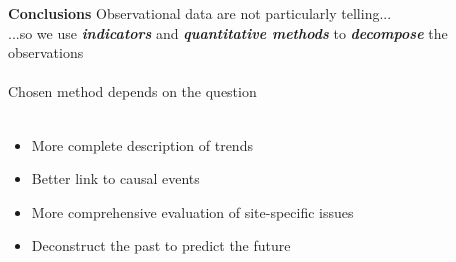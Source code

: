 \documentclass[serif]{beamer}\usepackage[]{graphicx}\usepackage[]{color}
\newcommand{\emtxt}[1]{\textbf{\textit{#1}}}
\begin{document}
\begin{frame}{\textbf{Conclusions}}
\onslide<+->
Observational data are not particularly telling... \\
...so we use \emtxt{indicators} and \emtxt{quantitative methods} to \emtxt{decompose} the observations \\~\\
\onslide<+->
Chosen method depends on the question \\~\\
\onslide<+->
\begin{itemize}
\item More complete description of trends
\item Better link to causal events
\item More comprehensive evaluation of site-specific issues
\item Deconstruct the past to predict the future\\~\\
\end{itemize}
\end{frame}
\end{document}
